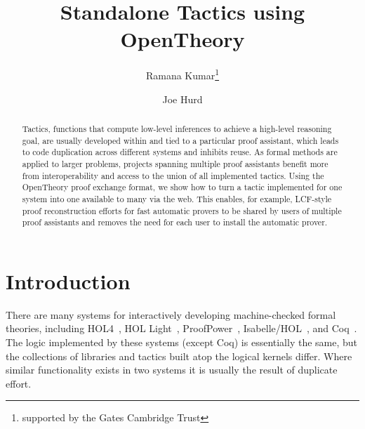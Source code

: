 \documentclass{llncs}
\begin{document}
\title{Standalone Tactics using OpenTheory}

\author{Ramana Kumar\thanks{supported by the Gates Cambridge Trust}\and Joe Hurd}


\maketitle

\begin{abstract}
Tactics, functions that compute low-level inferences to achieve a high-level reasoning goal, are usually developed within and tied to a particular proof assistant, which leads to code duplication across different systems and inhibits reuse.
As formal methods are applied to larger problems, projects spanning multiple proof assistants benefit more from interoperability and access to the union of all implemented tactics.
Using the OpenTheory proof exchange format, we show how to turn a tactic implemented for one system into one available to many via the web.
This enables, for example, LCF-style proof reconstruction efforts for fast automatic provers to be shared by users of multiple proof assistants and removes the need for each user to install the automatic prover.
\end{abstract}

\section{Introduction}
There are many systems for interactively developing machine-checked formal theories, including HOL4~\cite{slind08brief}, HOL Light~\cite{DBLP:conf/tphol/Harrison09a}, ProofPower~\cite{ProofPower}, Isabelle/HOL~\cite{wenzel08isabelle}, and Coq~\cite{bertot08short}.
The logic implemented by these systems (except Coq) is essentially the same, but the collections of libraries and tactics built atop the logical kernels differ.
Where similar functionality exists in two systems it is usually the result of duplicate effort.
\end{document}

